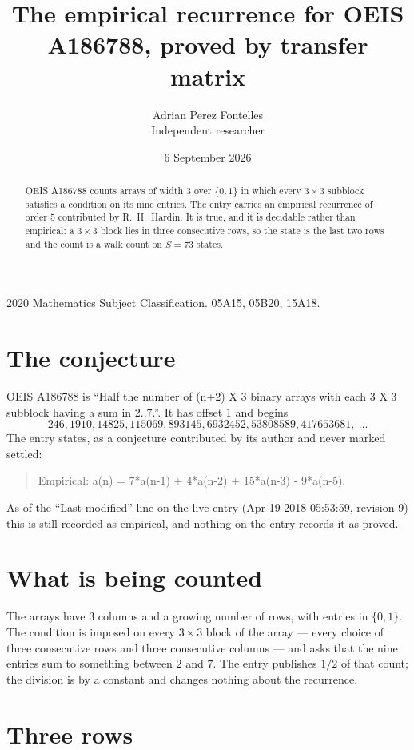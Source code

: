 \documentclass[11pt,a4paper]{article}
\title{The empirical recurrence for OEIS A186788, proved by transfer matrix}
\author{Adrian Perez Fontelles\\ \small Independent researcher}
\date{6 September 2026}
\theoremstyle{plain}
\theoremstyle{definition}
\begin{document}
\maketitle

\begin{abstract}
OEIS A186788 counts arrays of width $3$ over $\{0,1\}$ in which every $3\times3$ subblock
satisfies a condition on its nine entries. The entry carries an empirical recurrence of order
$5$ contributed by R.~H.~Hardin. It is true, and it is decidable rather than empirical: a
$3\times3$ block lies in three consecutive rows, so the state is the last two rows and the
count is a walk count on $S=73$ states.
\end{abstract}

\noindent\small 2020 Mathematics Subject Classification. 05A15, 05B20, 15A18.\normalsize

\section{The conjecture}

OEIS A186788 is ``Half the number of (n+2) X 3 binary arrays with each 3 X 3 subblock having a sum in 2..7.''. It has offset $1$ and begins
\[
246, 1910, 14825, 115069, 893145, 6932452, 53808589, 417653681,\ \dots
\]
The entry states, as a conjecture contributed by its author and never marked settled:
\begin{quote}
Empirical: a(n) = 7*a(n-1) + 4*a(n-2) + 15*a(n-3) - 9*a(n-5).
\end{quote}
As of the ``Last modified'' line on the live entry (Apr 19 2018 05:53:59, revision 9) this is still
recorded as empirical, and nothing on the entry records it as proved.

\section{What is being counted}

The arrays have $3$ columns and a growing number of rows, with entries in $\{0,1\}$. The
condition is imposed on every $3\times3$ block of the array --- every choice of three
consecutive rows and three consecutive columns --- and asks that the nine entries sum to something between $2$ and $7$. The entry publishes $1/2$ of that count; the division is by a constant and changes nothing about the recurrence.



\section{Three rows}
\end{document}

